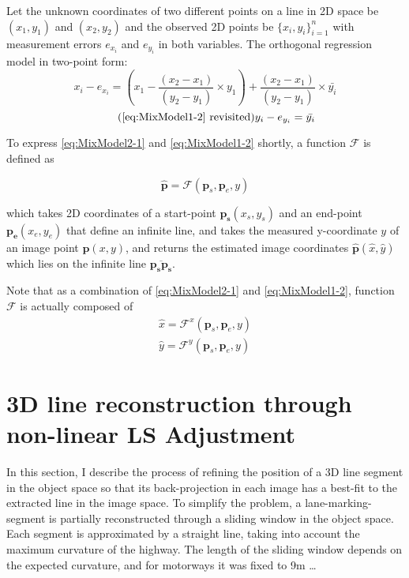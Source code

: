 Let the unknown coordinates of two different points on a line in 2D space be $(x_1,y_1)$ and $(x_2,y_2)$ and the observed 2D points be $\{x_i,y_i\}^n_{i=1}$ with measurement errors $e_{x_i}$ and $e_{y_i}$ in both variables. The orthogonal regression model in two-point form: 
\begin{equation} \label{eq:MixModel2-1}
x_i - e_{x_i}= (x_1-\dfrac{(x_2-x_1)}{(y_2-y_1)}\times y_1) + \dfrac{(x_2-x_1)}{(y_2-y_1)}\times \bar{y_i}
\end{equation}
\begin{equation} \tag{\ref{eq:MixModel1-2} revisited}
y_i-e_{y_i} = \bar{y_i}
\end{equation}

To express \eqref{eq:MixModel2-1} and \eqref{eq:MixModel1-2} shortly, a function $\mathcal{F}$ is defined as

\begin{equation} \label{eq:Ffunction}
\hat{\mathbf{p}} = \mathcal{F}(\mathbf{p}_s,\mathbf{p}_e,y)
\end{equation}

which takes 2D coordinates of a start-point $\mathbf{p_s}(x_s,y_s)$ and an end-point $\mathbf{p_e}(x_e,y_e)$ that define an infinite line, and takes the measured y-coordinate $y$ of an image point $\mathbf{p}(x,y)$, and returns the estimated image coordinates $\mathbf{\hat{p}}(\hat{x},\hat{y})$ which lies on the infinite line $\overline{\mathbf{p_s}\mathbf{p_s}}$.

Note that as a combination of \eqref{eq:MixModel2-1} and \eqref{eq:MixModel1-2}, function $\mathcal{F}$ is actually composed of
\begin{equation} \label{eq:Ffunction_xy}
\begin{split}
\hat{x} = \mathcal{F}^x(\mathbf{p}_s,\mathbf{p}_e,y)\\
\hat{y} = \mathcal{F}^y(\mathbf{p}_s,\mathbf{p}_e,y)
\end{split}
\end{equation}

\section{3D line reconstruction through non-linear LS Adjustment}
\label{sec:LSadj}

In this section, I describe the process of refining the position of a 3D line segment in the object space so that its back-projection in each image has a best-fit to the extracted line in the image space. To simplify the problem, a lane-marking-segment is partially reconstructed through a sliding window in the object space. Each segment is approximated by a straight line, taking into account the maximum curvature of the highway. 
The length of the sliding window depends on the expected curvature, and for motorways it was fixed to 9m …

